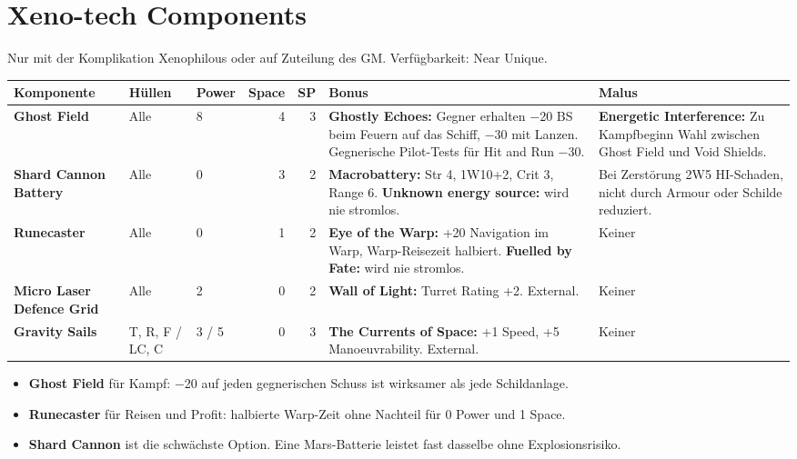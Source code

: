 \documentclass[9pt,a4paper]{extarticle}
\newcommand{\plus}[1]{\textcolor{good}{#1}}
\newcommand{\minus}[1]{\textcolor{bad}{#1}}
\newcommand{\nm}[1]{\textbf{#1}}
\newcommand{\eff}[1]{\textbf{#1:}}
\newcommand{\src}[1]{\hfill\raisebox{3pt}{\monofont\footnotesize\color{ink3}#1}}
\newenvironment{urteil}{\begin{tcolorbox}[colback=brasssoft,colframe=brass,boxrule=0pt,leftrule=2pt,arc=0pt,left=6pt,right=6pt,top=4pt,bottom=4pt,before skip=6pt,after skip=10pt,title={\monofont\scriptsize\bfseries\color{brass}URTEIL},coltitle=brass,colbacktitle=brasssoft,toptitle=2pt,bottomtitle=0pt,attach title to upper=\par]\begin{itemize}[leftmargin=10pt,itemsep=1pt,parsep=0pt,topsep=2pt]}{\end{itemize}\end{tcolorbox}}
\begin{document}
\section{Xeno-tech Components \src{S. 206--208, Tabelle 8-7}}
Nur mit der Komplikation Xenophilous oder auf Zuteilung des GM. Verfügbarkeit: Near Unique.

\begin{xltabular}{\linewidth}{l H P N N Y Y}
\toprule
{}\textbf{Komponente} & \textbf{Hüllen} & \textbf{Power} & \textbf{Space} & \textbf{SP} & \textbf{Bonus} & \textbf{Malus}\\
\midrule
\endhead
\nm{Ghost Field} & Alle & 8 & 4 & 3 & \eff{Ghostly Echoes} Gegner erhalten \plus{−20 BS} beim Feuern auf das Schiff, \plus{−30} mit Lanzen. Gegnerische Pilot-Tests für Hit and Run \plus{−30}. & \eff{Energetic Interference} Zu Kampfbeginn Wahl zwischen Ghost Field und Void Shields.\\
\nm{Shard Cannon Battery} & Alle & 0 & 3 & 2 & \eff{Macrobattery} Str 4, 1W10+2, Crit 3, Range 6. \eff{Unknown energy source} wird nie stromlos. & Bei Zerstörung \minus{2W5 HI-Schaden}, nicht durch Armour oder Schilde reduziert.\\
\nm{Runecaster} & Alle & 0 & 1 & 2 & \eff{Eye of the Warp} \plus{+20 Navigation} im Warp, \plus{Warp-Reisezeit halbiert}. \eff{Fuelled by Fate} wird nie stromlos. & Keiner\\
\nm{Micro Laser Defence Grid} & Alle & 2 & 0 & 2 & \eff{Wall of Light} \plus{Turret Rating +2}. External. & Keiner\\
\nm{Gravity Sails} & T, R, F / LC, C & 3 / 5 & 0 & 3 & \eff{The Currents of Space} \plus{+1 Speed}, \plus{+5 Manoeuvrability}. External. & Keiner\\
\bottomrule
\end{xltabular}

\begin{urteil}
\item \nm{Ghost Field} für Kampf: −20 auf jeden gegnerischen Schuss ist wirksamer als jede Schildanlage.
\item \nm{Runecaster} für Reisen und Profit: halbierte Warp-Zeit ohne Nachteil für 0 Power und 1 Space.
\item \nm{Shard Cannon} ist die schwächste Option. Eine Mars-Batterie leistet fast dasselbe ohne Explosionsrisiko.
\end{urteil}

\end{document}
